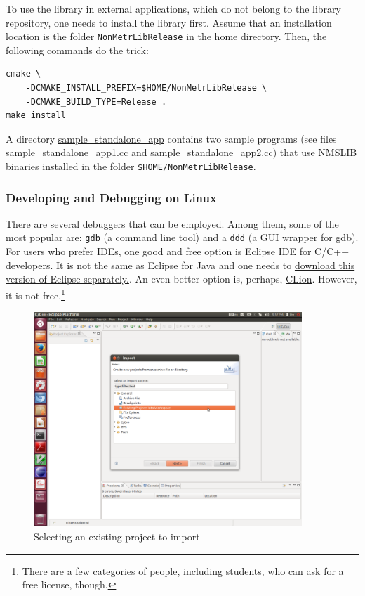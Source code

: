 \documentclass[runningheads,a4paper]{llncs}
\newcommand{\replocfile}{https://github.com/searchivarius/NonMetricSpaceLib/blob/pserv/}
\newcommand{\ttt}[1]{\texttt{#1}}
\begin{document}
{To use the library in external applications, which do not belong to the library repository,
one needs to install the library first.
Assume that an installation location is the folder \ttt{NonMetrLibRelease} in the
home directory. Then, the following commands do the trick:
\begin{verbatim}
cmake \
    -DCMAKE_INSTALL_PREFIX=$HOME/NonMetrLibRelease \
    -DCMAKE_BUILD_TYPE=Release .
make install
\end{verbatim}

A directory \href{\replocfile sample_standalone_app}{sample\_standalone\_app} 
contains two sample programs (see files 
\href{\replocfile sample_standalone_app/sample_standalone_app1.cc}{sample\_standalone\_app1.cc}
and
\href{\replocfile sample_standalone_app/sample_standalone_app2.cc}{sample\_standalone\_app2.cc})
that use NMSLIB binaries installed in the folder \ttt{\$HOME/NonMetrLibRelease}.

\subsubsection{Developing and Debugging on Linux}
There are several debuggers that can be employed.
Among them, some of the most popular are: \ttt{gdb} (a command line tool)
and a \ttt{ddd} (a GUI wrapper for gdb).
For users who prefer IDEs, one good and free option is Eclipse IDE for C/C++ developers.
It is not the same as Eclipse for Java and one needs 
to \href{http://www.eclipse.org/ide/}{download 
this version of Eclipse separately.}.
An even better option is, perhaps, \href{https://www.jetbrains.com/clion/}{CLion}. However, it is not free.\footnote{There are
a few categories of people, including students, who can ask for a free license, though.}

\begin{figure}
\centering
\caption{\label{FigEclipse1}Selecting an existing project to import}
\includegraphics[width=0.9\textwidth]{figures/Eclipse1.pdf}
\end{figure}

}
\end{document}
